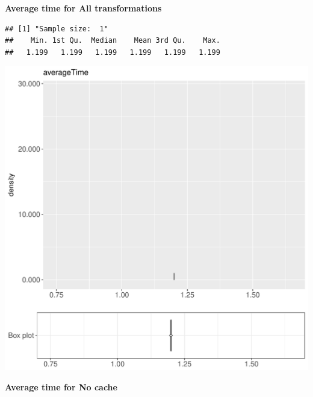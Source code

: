 \documentclass{article}\usepackage[]{graphicx}\usepackage[]{color}
\makeatletter
\def\maxwidth{ %
  \ifdim\Gin@nat@width>\linewidth
    \linewidth
  \else
    \Gin@nat@width
  \fi
}
\newenvironment{kframe}{%
 \def\at@end@of@kframe{}%
 \ifinner\ifhmode%
  \def\at@end@of@kframe{\end{minipage}}%
  \begin{minipage}{\columnwidth}%
 \fi\fi%
 \def\FrameCommand##1{\hskip\@totalleftmargin \hskip-\fboxsep
 \colorbox{shadecolor}{##1}\hskip-\fboxsep
     \hskip-\linewidth \hskip-\@totalleftmargin \hskip\columnwidth}%
 \MakeFramed {\advance\hsize-\width
   \@totalleftmargin\z@ \linewidth\hsize
   \@setminipage}}%
 {\par\unskip\endMakeFramed%
 \at@end@of@kframe}
\newenvironment{knitrout}{}{} %
\makeatother
\begin{document}
 \textbf{Average time for All transformations}
\begin{knitrout}
\color{fgcolor}\begin{kframe}
\begin{verbatim}
## [1] "Sample size:  1"
##    Min. 1st Qu.  Median    Mean 3rd Qu.    Max. 
##   1.199   1.199   1.199   1.199   1.199   1.199
\end{verbatim}


{\ttfamily\noindent\bfseries{}}\end{kframe}
\includegraphics[width=\maxwidth]{figure/RH1_cashew_big-1} 

\end{knitrout}
 \textbf{Average time for No cache}
\end{document}
